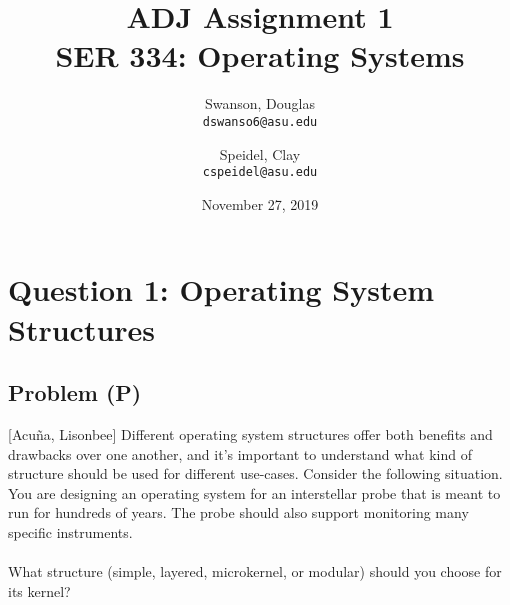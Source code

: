 \documentclass[12pt]{article}
\title{ADJ Assignment 1 \\ SER 334: Operating Systems}     %
\author{                        %
    Swanson, Douglas \\
    \texttt{dswanso6@asu.edu}
    \and
    Speidel, Clay \\
    \texttt{cspeidel@asu.edu}
    }
\date{November 27, 2019}        %
\begin{document}
    \maketitle
    \section{Question 1: Operating System Structures}
        \subsection{Problem (P)}
        [Acuña, Lisonbee] Different operating system structures offer both benefits and drawbacks over one
        another, and it's important to understand what kind of structure should be used for different use-cases.
        Consider the following situation. You are designing an operating system for an interstellar probe
        that is meant to run for hundreds of years. The probe should also support monitoring many specific
        instruments. \\ 
        \\
        What structure (simple, layered, microkernel, or modular) should you choose for its kernel?

\end{document}
